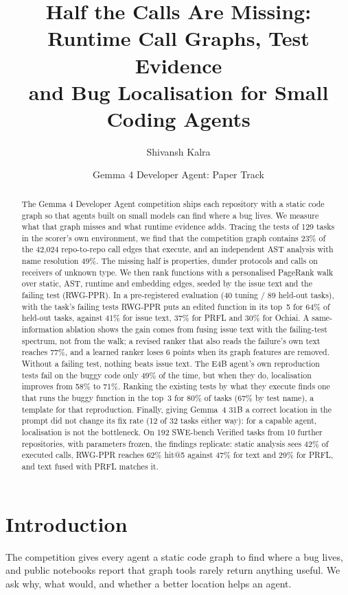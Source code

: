 \documentclass[10pt]{article}
\title{Half the Calls Are Missing: Runtime Call Graphs, Test Evidence\\and Bug Localisation for Small Coding Agents}
\author{Shivansh Kalra}
\date{Gemma 4 Developer Agent: Paper Track}
\begin{document}
\maketitle

\begin{abstract}
The Gemma 4 Developer Agent competition ships each repository with a static code graph so that agents built on small
models can find where a bug lives. We measure what that graph misses and what runtime evidence adds. Tracing the tests
of 129 tasks in the scorer's own environment, we find that the competition graph contains 23\% of the 42{,}024
repo-to-repo call edges that execute, and an independent AST analysis with name resolution 49\%. The missing half is
properties, dunder protocols and calls on receivers of unknown type. We then rank functions with a personalised
PageRank walk over static, AST, runtime and embedding edges, seeded by the issue text and the failing test (RWG-PPR).
In a pre-registered evaluation (40 tuning / 89 held-out tasks), with the task's failing tests RWG-PPR puts an edited
function in its top~5 for 64\% of held-out tasks, against 41\% for issue text, 37\% for PRFL and 30\% for Ochiai. A
same-information ablation shows the gain comes from fusing issue text with the failing-test spectrum, not from the
walk; a revised ranker that also reads the failure's own text reaches 77\%, and a learned ranker loses 6 points when
its graph features are removed. Without a failing test, nothing beats issue text. The E4B agent's own reproduction
tests fail on the buggy code only 49\% of the time, but when they do, localisation improves from 58\% to 71\%. Ranking
the existing tests by what they execute finds one that runs the buggy function in the top~3 for 80\% of tasks (67\% by
test name), a template for that reproduction. Finally, giving Gemma~4 31B a correct location in the prompt did not
change its fix rate (12 of 32 tasks either way): for a capable agent, localisation is not the bottleneck. On 192
SWE-bench Verified tasks from 10 further repositories, with parameters frozen, the findings replicate: static analysis
sees 42\% of executed calls, RWG-PPR reaches 62\% hit@5 against 47\% for text and 29\% for PRFL, and text fused with
PRFL matches it.
\end{abstract}

\section{Introduction}

The competition gives every agent a static code graph to find where a bug lives, and public notebooks report that graph
tools rarely return anything useful. We ask why, what would, and whether a better location helps an agent.
\end{document}
